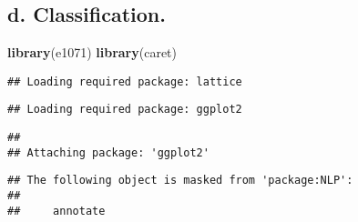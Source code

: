 \documentclass[]{article}
\newenvironment{Shaded}{\begin{snugshade}}{\end{snugshade}}
\newcommand{\KeywordTok}[1]{\textcolor[rgb]{0.13,0.29,0.53}{\textbf{#1}}}
\newcommand{\NormalTok}[1]{#1}
\begin{document}
\hypertarget{d.-classification.}{%
\subsection{d. Classification.}\label{d.-classification.}}

\begin{Shaded}
\begin{Highlighting}[]
\KeywordTok{library}\NormalTok{(e1071)}
\KeywordTok{library}\NormalTok{(caret)}
\end{Highlighting}
\end{Shaded}

\begin{verbatim}
## Loading required package: lattice
\end{verbatim}

\begin{verbatim}
## Loading required package: ggplot2
\end{verbatim}

\begin{verbatim}
## 
## Attaching package: 'ggplot2'
\end{verbatim}

\begin{verbatim}
## The following object is masked from 'package:NLP':
## 
##     annotate
\end{verbatim}
\end{document}
